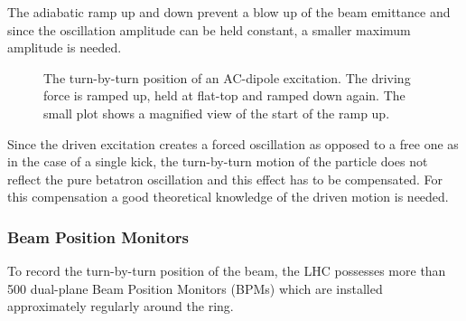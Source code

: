 The adiabatic ramp up and down prevent a blow up of the beam emittance and since the oscillation amplitude
can be held constant, a smaller maximum amplitude is needed. 
%
\begin{figure}[h]
    \centering
    \caption{
        The turn-by-turn position of an AC-dipole excitation. The driving force is ramped up,
        held at flat-top and ramped down again.
        The small plot shows a magnified view of the start of the ramp up.
    }
    \label{fig_ac_plot}
\end{figure}
%
Since the driven excitation creates a forced oscillation as opposed to a free one as in the case of
a single kick, the turn-by-turn motion of the particle does not reflect the pure betatron oscillation
and this effect has to be compensated. For this compensation a good theoretical knowledge of the driven
motion is needed.


\subsubsection{Beam Position Monitors}

To record the turn-by-turn position of the beam, the LHC possesses more than 500 dual-plane
Beam Position Monitors (BPMs) which are installed approximately regularly around the ring. 

